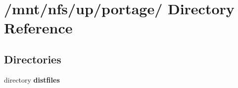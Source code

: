 \section{/mnt/nfs/up/portage/ Directory Reference}
\label{dir_11ef03e38b419d1e5f3fb8719087608a}
\subsection*{Directories}
\begin{CompactItemize}
\item 
directory \bf{distfiles}
\end{CompactItemize}
